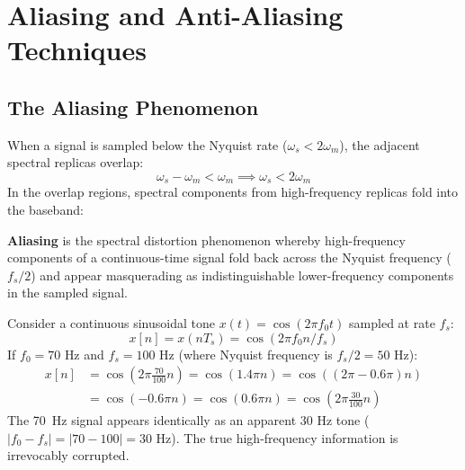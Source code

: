 \documentclass[12pt,a4paper]{article}
\begin{document}
\section{Aliasing and Anti-Aliasing Techniques}

\subsection{The Aliasing Phenomenon}
When a signal is sampled below the Nyquist rate ($\omega_s < 2\omega_m$), the adjacent spectral replicas overlap:
\begin{equation}
  \omega_s - \omega_m < \omega_m \implies \omega_s < 2\omega_m
\end{equation}
In the overlap regions, spectral components from high-frequency replicas fold into the baseband:

\begin{tcolorbox}[defbox, title={\textbf{Definition: Aliasing}}]
\textbf{Aliasing} is the spectral distortion phenomenon whereby high-frequency components of a continuous-time signal fold back across the Nyquist frequency ($f_s / 2$) and appear masquerading as indistinguishable lower-frequency components in the sampled signal.
\end{tcolorbox}

\begin{tcolorbox}[examplebox, title={\textbf{Demonstration: Aliased Frequency of a Sinusoid}}]
Consider a continuous sinusoidal tone $x(t) = \cos(2\pi f_0 t)$ sampled at rate $f_s$:
\begin{equation*}
  x[n] = x(n T_s) = \cos(2\pi f_0 n / f_s)
\end{equation*}
If $f_0 = 70\text{ Hz}$ and $f_s = 100\text{ Hz}$ (where Nyquist frequency is $f_s/2 = 50\text{ Hz}$):
\begin{align*}
  x[n] &= \cos\left(2\pi \frac{70}{100} n\right) = \cos(1.4\pi n) = \cos((2\pi - 0.6\pi) n) \\
  &= \cos(-0.6\pi n) = \cos(0.6\pi n) = \cos\left(2\pi \frac{30}{100} n\right)
\end{align*}
The 70~Hz signal appears identically as an apparent $30\text{ Hz}$ tone ($|f_0 - f_s| = |70 - 100| = 30\text{ Hz}$). The true high-frequency information is irrevocably corrupted.
\end{tcolorbox}
\end{document}
